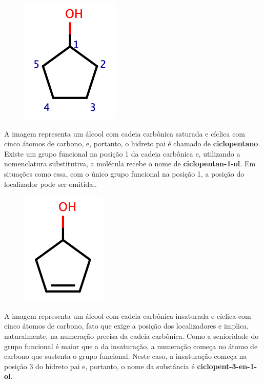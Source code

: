 \begin{tcolorbox}[colback=white!5!white,colframe=orange!90!black,title=\textbf{Exemplo 2}]
	\begin{figure}[H]
		\centering
		\includegraphics[width=0.20\linewidth]{imagens/ciclopentanol.png}
		\label{fig:ciclopentanol}
	\end{figure}
	\tcblower
	A imagem representa um álcool com cadeia carbônica saturada e cíclica com cinco átomos de carbono, e, portanto, o hidreto pai é chamado de \textbf{ciclopentano}. Existe um grupo funcional na posição 1 da cadeia carbônica e, utilizando a nomenclatura substitutiva, a molécula recebe o nome de \textbf{ciclopentan-1-ol}. Em situações como essa, com o único grupo funcional na posição 1, a posição do localizador pode ser omitida..
\end{tcolorbox}


\begin{tcolorbox}[colback=white!5!white,colframe=orange!90!black,title=\textbf{Exemplo 3}]
	\begin{figure}[h]
		\centering
		\includegraphics[width=0.20\linewidth]{imagens/cpd.png}
		\label{fig:cpd}
	\end{figure}
	\tcblower
	A imagem representa um álcool com cadeia carbônica insaturada e cíclica com cinco átomos de carbono, fato que exige a posição dos localizadores e implica, naturalmente, na numeração precisa da cadeia carbônica. Como a senioridade do grupo funcional é maior que a da insaturação, a numeração começa no átomo de carbono que sustenta o grupo funcional. Neste caso, a insaturação começa na posição 3 do hidreto pai e, portanto, o nome da substância é \textbf{ciclopent-3-en-1-ol}.
\end{tcolorbox}


